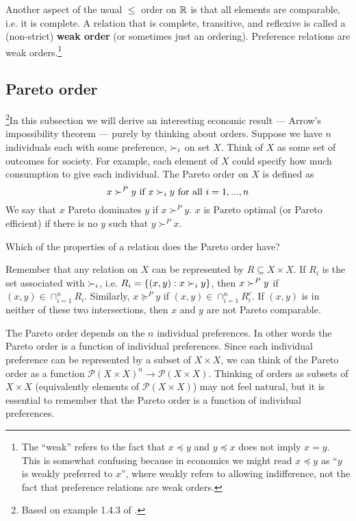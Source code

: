 Another aspect of the usual $\leq$ order on $\mathbb{R}$ is that all elements
are comparable, i.e. it is complete. A relation that is complete,
transitive, and reflexive is called a (non-strict) \textbf{weak order}
(or sometimes just an ordering). Preference relations are weak
orders.\footnote{The ``weak'' refers to the fact that $x \preceq y$
  and $y \preceq x$ does not imply $x=y$. This is somewhat confusing
  because in economics we might read $x \preceq y$ as ``$y$ is weakly
  preferred to $x$'', where weakly refers to allowing indifference,
  not the fact that preference relations are weak orders.}

\subsection{Pareto order}

\footnote{Based on example 1.4.3 of \cite{carter2001}.}In this
subsection we will derive an interesting economic result --- Arrow's
impossibility theorem --- purely by thinking about orders.  Suppose we
have $n$ individuals each with some preference, $\succ_i$ on set
$X$. Think of $X$ as some set of outcomes for society. For example,
each element of $X$ could specify how much consumption to give each
individual. The  Pareto order on $X$ is defined as
\[ x \succ^P y \text{ if } x \succ_i y \text{ for all } i=1,...,n \]
We say that $x$ Pareto dominates $y$ if $x \succ^P y$. $x$ is Pareto
optimal (or Pareto efficient) if there is no $y$ such that $y \succ^P
x$. 
\begin{exercise}
  Which of the properties of a relation does the Pareto order have?
\end{exercise}

Remember that any relation on $X$ can be represented by $R \subseteq X
\times X$. If $R_i$ is the set associated with $\succ_i$, i.e. $R_i =
\{(x,y): x \succ_i y \}$, then $x \succ^P y$ if 
$(x,y) \in \cap_{i=1}^n R_i$. Similarly, $x \succeq^P y$ if $(x,y) \in
\cap_{i=1}^n R_i^c$. If $(x,y)$ is in neither of these two
intersections, then $x$ and $y$ are not Pareto comparable. 

The Pareto order depends on the $n$ individual preferences. In other
words the Pareto order is a function of individual preferences. Since
each individual preference can be represented by a subset of $X \times
X$, we can think of the Pareto order as a function $\mathcal{P}(X
\times X)^n \to \mathcal{P}(X \times X)$. Thinking of orders as
subsets of $X \times X$ (equivalently elements of $\mathcal{P}(X\times
X)$) may not feel natural, but it is essential to remember
that the Pareto order is a function of individual preferences.

